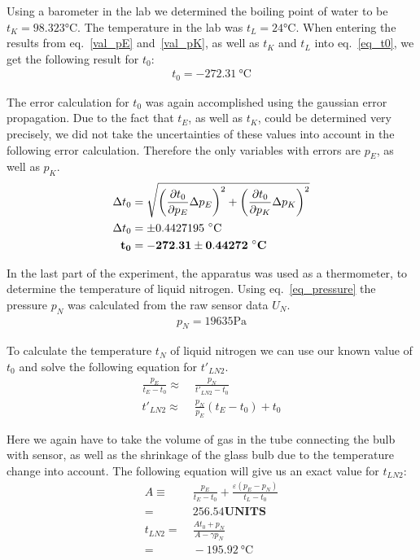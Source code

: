     Using a barometer in the lab we determined the boiling point of water to be $t_K = 98.323 \si{\celsius}$.
    The temperature in the lab was $t_L = 24 \si{\celsius}$.
    When entering the results from eq.~\ref{val_pE} and~\ref{val_pK}, as well as $t_K$ and $t_L$ into eq.~\ref{eq_t0},
    we get the following result for $t_0$:
    \begin{align}
        t_0 = -272.31~\si{\celsius} \label{val_t0}
    \end{align}

    The error calculation for $t_0$ was again accomplished using the gaussian error propagation.
    Due to the fact that $t_E$, as well as $t_K$, could be determined very precisely, we did not take
    the uncertainties of these values into account in the following error calculation.
    Therefore the only variables with errors are $p_E$, as well as $p_K$.
    \begin{align}
        \Delta t_0 &= \sqrt{ \left(\frac{\partial t_0}{\partial p_E} \Delta p_E \right)^2 +
                            \left(\frac{\partial t_0}{\partial p_K} \Delta p_K \right)^2 }\\
        \Delta t_0 &= \pm 0.4427195~\si{\celsius} \label{dlta_t0}\\
        \bf t_0 &= \bf -272.31 \pm 0.44272~\si{\bf\celsius} \label{res_t0}
    \end{align}

    In the last part of the experiment, the apparatus was used as a thermometer, to determine the 
    temperature of liquid nitrogen.
    Using eq.~\ref{eq_pressure} the pressure $p_N$ was calculated from the raw sensor data $U_N$.
    \begin{align}
        p_N = 19635 \si{\pascal}
    \end{align}

    To calculate the temperature $t_N$ of liquid nitrogen we can use our known value of $t_0$ and solve
    the following equation for $t'_{LN2}$.
    \begin{align}
        \frac{p_E}{t_E - t_0} \approx& \; \frac{p_N}{t'_{LN2} - t_0}\\
        t'_{LN2} \approx& \; \frac{p_N}{p_E}(t_E - t_0) + t_0
    \end{align}

    Here we again have to take the volume of gas in the tube connecting the bulb with sensor,
    as well as the shrinkage of the glass bulb due to the temperature change into account.
    The following equation will give us an exact value for $t_{LN2}$:
    \begin{align}
        A \equiv& \; \frac{p_E}{t_E - t_0} + \frac{\varepsilon(p_E - p_N)}{t_L - t_0}\\
        =& \; 256.54 \textbf{UNITS}\\
        t_{LN2} =& \; \frac{A t_0 + p_N}{A - \gamma p_N}\\
        =& \; -195.92~\si{\celsius} \label{val_tN}
    \end{align}

